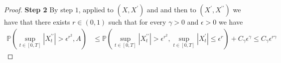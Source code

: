 \documentclass[11pt,a4paper]{article}
\theoremstyle{plain}
\begin{document}
\begin{proof}
    \textbf{Step 2} By step $1$, applied to $(X,X^{\prime})$ and and then to $(X^{\prime},X^{\prime\prime})$ we have that there exists $r \in (0,1)$ such that for every $\gamma > 0$ and $\epsilon > 0$ we have
    \begin{align*}
        \mathbb{P}\left(\sup_{t\in[0,T]}|X^{\prime\prime}_t| > \epsilon^{r^2}, A\right)
        &\leq 
        \mathbb{P}(\sup_{t\in[0,T]}|X^{\prime\prime}_t| > \epsilon^{r^2},
        \sup_{t\in[0,T]}|X^\prime_t| \leq \epsilon^{r}) + C_{\gamma}\epsilon^{\gamma}
        \leq C_{\gamma} \epsilon^{r\gamma}
    \end{align*}
    

\end{proof}
\end{document}
